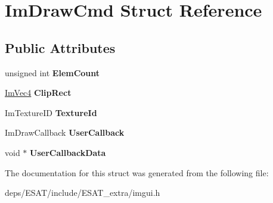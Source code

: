 \hypertarget{struct_im_draw_cmd}{}\section{Im\+Draw\+Cmd Struct Reference}
\label{struct_im_draw_cmd}
\subsection*{Public Attributes}
\begin{DoxyCompactItemize}
\item 
\mbox{\label{struct_im_draw_cmd_aafe2532964fb1f6905d67d84dd3e8730}} 
unsigned int {\bfseries Elem\+Count}
\item 
\mbox{\label{struct_im_draw_cmd_a838918f420ff81cb8dc7265077592daa}} 
\mbox{\hyperlink{struct_im_vec4}{Im\+Vec4}} {\bfseries Clip\+Rect}
\item 
\mbox{\label{struct_im_draw_cmd_a4f3b5985ece9ca6b71e7a8e7d85a82e5}} 
Im\+Texture\+ID {\bfseries Texture\+Id}
\item 
\mbox{\label{struct_im_draw_cmd_ad26dac4e939f5c4bb892cbca0f9e3af8}} 
Im\+Draw\+Callback {\bfseries User\+Callback}
\item 
\mbox{\label{struct_im_draw_cmd_ae2f5a0baf4a0b25942237b8ce6adb42d}} 
void $\ast$ {\bfseries User\+Callback\+Data}
\end{DoxyCompactItemize}


The documentation for this struct was generated from the following file\+:\begin{DoxyCompactItemize}
\item 
deps/\+E\+S\+A\+T/include/\+E\+S\+A\+T\+\_\+extra/imgui.\+h\end{DoxyCompactItemize}
